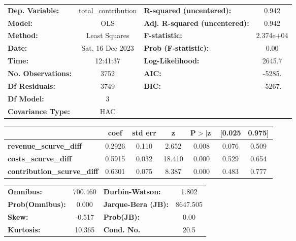 \begin{center}
\begin{tabular}{lclc}
\toprule
\textbf{Dep. Variable:}             & total\_contribution & \textbf{  R-squared (uncentered):}      &     0.942   \\
\textbf{Model:}                     &         OLS         & \textbf{  Adj. R-squared (uncentered):} &     0.942   \\
\textbf{Method:}                    &    Least Squares    & \textbf{  F-statistic:       }          & 2.374e+04   \\
\textbf{Date:}                      &   Sat, 16 Dec 2023  & \textbf{  Prob (F-statistic):}          &     0.00    \\
\textbf{Time:}                      &       12:41:37      & \textbf{  Log-Likelihood:    }          &    2645.7   \\
\textbf{No. Observations:}          &          3752       & \textbf{  AIC:               }          &    -5285.   \\
\textbf{Df Residuals:}              &          3749       & \textbf{  BIC:               }          &    -5267.   \\
\textbf{Df Model:}                  &             3       & \textbf{                     }          &             \\
\textbf{Covariance Type:}           &         HAC         & \textbf{                     }          &             \\
\bottomrule
\end{tabular}
\begin{tabular}{lcccccc}
                                    & \textbf{coef} & \textbf{std err} & \textbf{z} & \textbf{P$> |$z$|$} & \textbf{[0.025} & \textbf{0.975]}  \\
\midrule
\textbf{revenue\_scurve\_diff}      &       0.2926  &        0.110     &     2.652  &         0.008        &        0.076    &        0.509     \\
\textbf{costs\_scurve\_diff}        &       0.5915  &        0.032     &    18.410  &         0.000        &        0.529    &        0.654     \\
\textbf{contribution\_scurve\_diff} &       0.6301  &        0.075     &     8.387  &         0.000        &        0.483    &        0.777     \\
\bottomrule
\end{tabular}
\begin{tabular}{lclc}
\textbf{Omnibus:}       & 700.460 & \textbf{  Durbin-Watson:     } &    1.802  \\
\textbf{Prob(Omnibus):} &   0.000 & \textbf{  Jarque-Bera (JB):  } & 8647.505  \\
\textbf{Skew:}          &  -0.517 & \textbf{  Prob(JB):          } &     0.00  \\
\textbf{Kurtosis:}      &  10.365 & \textbf{  Cond. No.          } &     20.5  \\
\bottomrule
\end{tabular}
\end{center}